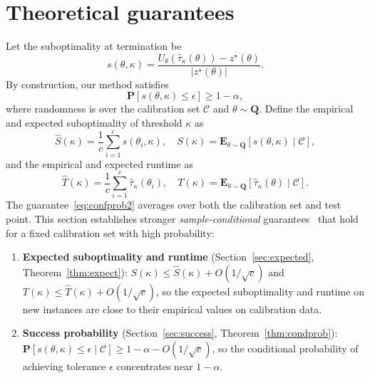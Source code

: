 \documentclass[12pt]{article}
\renewcommand{\cite}[1]{\citep{#1}}
\theoremstyle{definition}
\theoremstyle{remark}
\newcommand{\paramdist}{\mathbf{Q}}
\newcommand{\param}{\theta}
\newcommand{\Prob}{\mathbf{P}}
\newcommand{\UB}{U}
\newcommand{\ov}{z^\star}
\newcommand{\E}{\mathbf{E}}
\newcommand{\tol}{\epsilon}
\newcommand{\errorprob}{\alpha}
\newcommand{\pst}{\hat{\tau}}
\newcommand{\calibration}{\mathcal{C}}
\newcommand{\termov}{s}
\newcommand{\lt}{\kappa}
\newcommand{\ncalib}{c}
\newcommand{\runtime}{T}
\newcommand{\change}[1]{#1}
\newcommand{\paramdist}{\mathbf{Q}}
\newcommand{\param}{\theta}
\newcommand{\Prob}{\mathbf{P}}
\newcommand{\UB}{U}
\newcommand{\ov}{z^\star}
\newcommand{\E}{\mathbf{E}}
\newcommand{\tol}{\epsilon}
\newcommand{\errorprob}{\alpha}
\newcommand{\pst}{\hat{\tau}}
\newcommand{\calibration}{\mathcal{C}}
\newcommand{\termov}{s}
\newcommand{\lt}{\kappa}
\newcommand{\ncalib}{c}
\newcommand{\runtime}{T}
\newcommand{\change}[1]{#1}
\theoremstyle{plain}
\theoremstyle{definition}
\theoremstyle{remark}
\begin{document}
\section{Theoretical guarantees}
Let the suboptimality at termination be
\begin{equation*}
    \termov(\param, \lt) = \frac{\change{\UB_\param(\pst_{\lt}(\param))} - \ov(\param)}{|\ov({\param})|}.
\end{equation*}
By construction, our method satisfies
\begin{equation}
\Prob[\termov(\param, \lt) \le \tol] \ge 1 - \errorprob, \label{eq:confprob2}
\end{equation}
where randomness is over the calibration set $\calibration$ and $\param \sim \paramdist$.
Define the empirical and expected suboptimality of threshold $\lt$ as
\begin{equation*}
    \hat{S}(\lt) = \frac{1}{\ncalib} \sum_{i=1}^\ncalib \termov(\param_i, \lt), \quad S(\lt) = \E_{\param \sim \paramdist} [\termov(\param, \lt) \mid \calibration],
\end{equation*}
and the empirical and expected runtime as
\begin{equation*}
    \hat{\runtime}(\lt) = \frac{1}{\ncalib} \sum_{i=1}^\ncalib \pst_\lt(\param_i), \quad \runtime(\lt) = \E_{\param \sim \paramdist} [\pst_\lt(\param) \mid \calibration].
\end{equation*}
The guarantee~\eqref{eq:confprob2} averages over both the calibration set and test point.
This section establishes stronger \emph{sample-conditional} guarantees~\cite{Duchi2025AFO} that hold for a fixed calibration set with high probability:
\begin{enumerate}
    \item \textbf{Expected suboptimality and runtime} (Section~\ref{sec:expected}, Theorem~\ref{thm:expect}): $S(\lt) \le \hat{S}(\lt) + O(1/\sqrt{\ncalib})$ and $\runtime(\lt) \le \hat{\runtime}(\lt) + O(1/\sqrt{\ncalib})$, so the expected suboptimality and runtime on new instances are close to their empirical values on calibration data.
    \item \textbf{Success probability} (Section~\ref{sec:success}, Theorem~\ref{thm:condprob}): $\Prob[\termov(\param, \lt) \le \tol \mid \calibration] \ge 1 - \alpha - O(1/\sqrt{\ncalib})$, so the conditional probability of achieving tolerance $\tol$ concentrates near $1 - \alpha$.
\end{enumerate}
\end{document}
